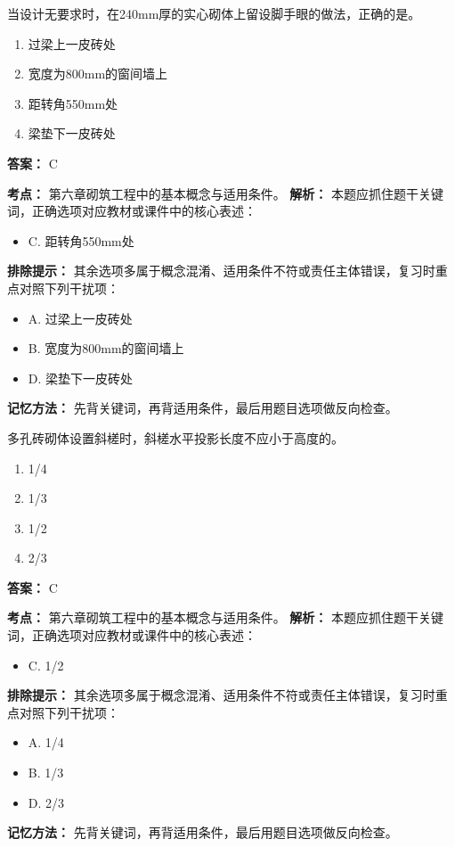 \documentclass[UTF8,fontset=fandol,11pt]{ctexart}
\begin{document}
\begin{quizbox}[title={第 19 题}]
当设计无要求时，在240mm厚的实心砌体上留设脚手眼的做法，正确的是。\\
\begin{enumerate}[label=\Alph*.]
\item 过梁上一皮砖处
\item 宽度为800mm的窗间墙上
\item 距转角550mm处
\item 梁垫下一皮砖处
\end{enumerate}
\textbf{答案：} C
\vspace{0.25em}
\begin{answerbox}[title={考点解析}]
\textbf{考点：} 第六章砌筑工程中的基本概念与适用条件。
\textbf{解析：} 本题应抓住题干关键词，正确选项对应教材或课件中的核心表述：
\begin{itemize}
\item C. 距转角550mm处
\end{itemize}
\textbf{排除提示：} 其余选项多属于概念混淆、适用条件不符或责任主体错误，复习时重点对照下列干扰项：
\begin{itemize}
\item A. 过梁上一皮砖处
\item B. 宽度为800mm的窗间墙上
\item D. 梁垫下一皮砖处
\end{itemize}
\textbf{记忆方法：} 先背关键词，再背适用条件，最后用题目选项做反向检查。
\end{answerbox}
\end{quizbox}

\begin{quizbox}[title={第 20 题}]
多孔砖砌体设置斜槎时，斜槎水平投影长度不应小于高度的。\\
\begin{enumerate}[label=\Alph*.]
\item 1/4
\item 1/3
\item 1/2
\item 2/3
\end{enumerate}
\textbf{答案：} C
\vspace{0.25em}
\begin{answerbox}[title={考点解析}]
\textbf{考点：} 第六章砌筑工程中的基本概念与适用条件。
\textbf{解析：} 本题应抓住题干关键词，正确选项对应教材或课件中的核心表述：
\begin{itemize}
\item C. 1/2
\end{itemize}
\textbf{排除提示：} 其余选项多属于概念混淆、适用条件不符或责任主体错误，复习时重点对照下列干扰项：
\begin{itemize}
\item A. 1/4
\item B. 1/3
\item D. 2/3
\end{itemize}
\textbf{记忆方法：} 先背关键词，再背适用条件，最后用题目选项做反向检查。
\end{answerbox}
\end{quizbox}
\end{document}
